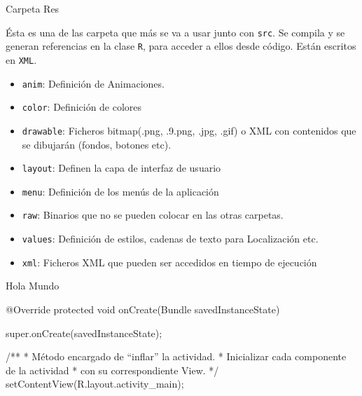 \begin{frame}{Carpeta Res}
\begin{block}{}
Ésta es una de las carpeta que más se va a usar junto con \texttt{src}. Se compila y se generan referencias en la clase \texttt{R}, para acceder a ellos desde código. Están escritos en \texttt{XML}.
\pause
\end{block}
\begin{itemize}
    \item<2-> \texttt{anim}: Definición de Animaciones.
    \item<3-> \texttt{color}: Definición de colores
    \item<4-> \texttt{drawable}: Ficheros bitmap(.png, .9.png, .jpg, .gif) o XML con contenidos que se dibujarán (fondos, botones etc).
    \item<5-> \texttt{layout}: Definen la capa de interfaz de usuario
    \item<6-> \texttt{menu}: Definición de los menús de la aplicación
    \item<7-> \texttt{raw}: Binarios que no se pueden colocar en las otras carpetas.
    \item<8-> \texttt{values}: Definición de estilos, cadenas de texto para Localización etc.
    \item<9-> \texttt{xml}: Ficheros XML que pueden ser accedidos en tiempo de ejecución
\end{itemize}
\end{frame}

\begin{frame}[fragile]{Hola Mundo}
\begin{block}{}
\begin{javacode}
    @Override
    protected void onCreate(Bundle savedInstanceState) {
        super.onCreate(savedInstanceState);

        /**
         * Método encargado de “inflar” la actividad.
         * Inicializar cada componente de la actividad
         * con su correspondiente View.
         */
        setContentView(R.layout.activity_main);
    }
\end{javacode}
\end{block}
\end{frame}

